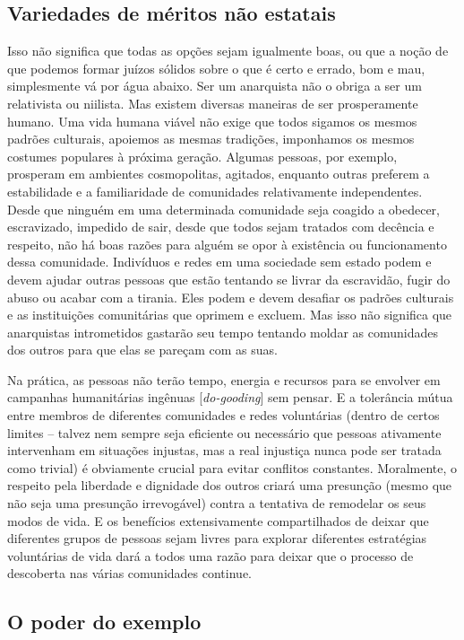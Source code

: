 \subsection*{Variedades de méritos não estatais}

Isso não significa que todas as opções sejam igualmente boas, ou que a noção de que podemos formar juízos sólidos sobre o que é certo e errado, bom e mau, simplesmente vá por água abaixo. Ser um anarquista não o obriga a ser um relativista ou niilista. Mas existem diversas maneiras de ser prosperamente humano. Uma vida humana viável não exige que todos sigamos os mesmos padrões culturais, apoiemos as mesmas tradições, imponhamos os mesmos costumes populares à próxima geração. Algumas pessoas, por exemplo, prosperam em ambientes cosmopolitas, agitados, enquanto outras preferem a estabilidade e a familiaridade de comunidades relativamente independentes. Desde que ninguém em uma determinada comunidade seja coagido a obedecer, escravizado, impedido de sair, desde que todos sejam tratados com decência e respeito, não há boas razões para alguém se opor à existência ou funcionamento dessa comunidade. Indivíduos e redes em uma sociedade sem estado podem e devem ajudar outras pessoas que estão tentando se livrar da escravidão, fugir do abuso ou acabar com a tirania. Eles podem e devem desafiar os padrões culturais e as instituições comunitárias que oprimem e excluem. Mas isso não significa que anarquistas intrometidos gastarão seu tempo tentando moldar as comunidades dos outros para que elas se pareçam com as suas.

Na prática, as pessoas não terão tempo, energia e recursos para se envolver em campanhas humanitárias ingênuas [\emph{do-gooding}] sem pensar. E a tolerância mútua entre membros de diferentes comunidades e redes voluntárias (dentro de certos limites -- talvez nem sempre seja eficiente ou necessário que pessoas ativamente intervenham em situações injustas, mas a real injustiça nunca pode ser tratada como trivial) é obviamente crucial para evitar conflitos constantes. Moralmente, o respeito pela liberdade e dignidade dos outros criará uma presunção (mesmo que não seja uma presunção irrevogável) contra a tentativa de remodelar os seus modos de vida. E os benefícios extensivamente compartilhados de deixar que diferentes grupos de pessoas sejam livres para explorar diferentes estratégias voluntárias de vida dará a todos uma razão para deixar que o processo de descoberta nas várias comunidades continue.

\subsection*{O poder do exemplo}

